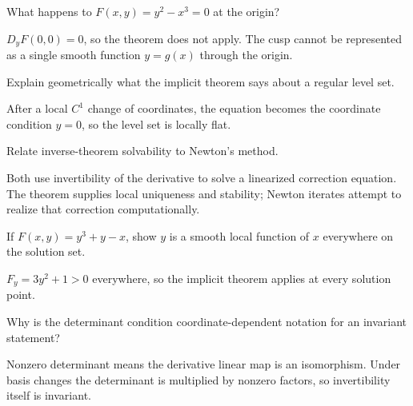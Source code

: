 \begin{problem}\label{prob:ii09-problem-07}
What happens to $F(x,y)=y^2-x^3=0$ at the origin?
\end{problem}
\begin{solution}
$D_yF(0,0)=0$, so the theorem does not apply. The cusp cannot be represented as a single smooth function $y=g(x)$ through the origin.
\end{solution}

\begin{problem}\label{prob:ii09-problem-08}
Explain geometrically what the implicit theorem says about a regular level set.
\end{problem}
\begin{solution}
After a local $C^1$ change of coordinates, the equation becomes the coordinate condition $y=0$, so the level set is locally flat.
\end{solution}

\begin{problem}\label{prob:ii09-problem-09}
Relate inverse-theorem solvability to Newton's method.
\end{problem}
\begin{solution}
Both use invertibility of the derivative to solve a linearized correction equation. The theorem supplies local uniqueness and stability; Newton iterates attempt to realize that correction computationally.
\end{solution}

\begin{problem}\label{prob:ii09-problem-10}
If $F(x,y)=y^3+y-x$, show $y$ is a smooth local function of $x$ everywhere on the solution set.
\end{problem}
\begin{solution}
$F_y=3y^2+1>0$ everywhere, so the implicit theorem applies at every solution point.
\end{solution}

\begin{problem}\label{prob:ii09-problem-11}
Why is the determinant condition coordinate-dependent notation for an invariant statement?
\end{problem}
\begin{solution}
Nonzero determinant means the derivative linear map is an isomorphism. Under basis changes the determinant is multiplied by nonzero factors, so invertibility itself is invariant.
\end{solution}

